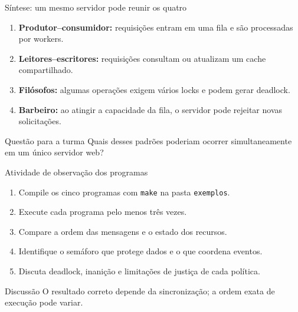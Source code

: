 \documentclass[aspectratio=169,11pt]{beamer}
\begin{document}
\begin{frame}{Síntese: um mesmo servidor pode reunir os quatro}
\small
\begin{enumerate}
\setlength\itemsep{0.22cm}
\item \textbf{Produtor--consumidor:} requisições entram em uma fila e são processadas por workers.
\item \textbf{Leitores--escritores:} requisições consultam ou atualizam um cache compartilhado.
\item \textbf{Filósofos:} algumas operações exigem vários locks e podem gerar deadlock.
\item \textbf{Barbeiro:} ao atingir a capacidade da fila, o servidor pode rejeitar novas solicitações.
\end{enumerate}
\begin{alertblock}{Questão para a turma}
Quais desses padrões poderiam ocorrer simultaneamente em um único servidor web?
\end{alertblock}
\end{frame}

\begin{frame}{Atividade de observação dos programas}
\small
\begin{enumerate}
\setlength\itemsep{0.23cm}
\item Compile os cinco programas com \texttt{make} na pasta \texttt{exemplos}.
\item Execute cada programa pelo menos três vezes.
\item Compare a ordem das mensagens e o estado dos recursos.
\item Identifique o semáforo que protege dados e o que coordena eventos.
\item Discuta deadlock, inanição e limitações de justiça de cada política.
\end{enumerate}
\begin{block}{Discussão}
O resultado correto depende da sincronização; a ordem exata de execução pode variar.
\end{block}
\end{frame}
\end{document}
